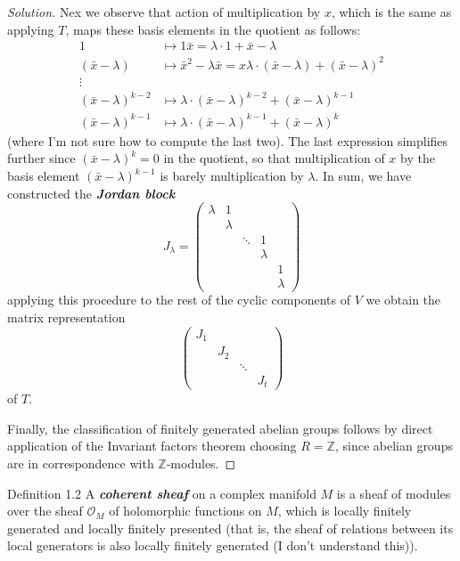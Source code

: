 \begin{proof}[Solution]
Nex we observe that action of multiplication by $x$, which is the same as applying $T$, maps these basis elements in the quotient as follows:
\begin{align*}
	1&\mapsto 1\bar{x}=\lambda\cdot 1+\bar{x}-\lambda\\
	(\bar{x}-\lambda)&\mapsto \bar{x}^2-\lambda\bar{x}=x\lambda\cdot (\bar{x}-\lambda)+(\bar{x}-\lambda)^2\\
	\vdots & \\
	(\bar{x}-\lambda)^{k-2}&\mapsto \lambda\cdot (\bar{x}-\lambda)^{k-2}+(\bar{x}-\lambda)^{k-1}\\
	(\bar{x}-\lambda)^{k-1}&\mapsto \lambda\cdot (\bar{x}-\lambda)^{k-1}+(\bar{x}-\lambda)^k
\end{align*}
(where I'm not sure how to compute the last two). The last expression simplifies further since $(\bar{x}-\lambda)^k=0$ in the quotient, so that multiplication of $x$ by the basis element $( \bar{x}-\lambda)^{k-1}$ is barely multiplication by $\lambda$. In sum, we have constructed the  \textit{\textbf{Jordan block}}
\[J_{\lambda}=\begin{pmatrix} \lambda &1\\
&\lambda\\
&&\ddots&1\\
&&&\lambda\\
&&&&1\\
&&&&\lambda
\end{pmatrix} \]
applying this procedure to the rest of the cyclic components of $V$ we obtain the  matrix representation
 \[\begin{pmatrix} J_1\\
 &J_2\\
 &&\ddots\\
 &&&J_t\end{pmatrix} \]
of $T$.

Finally, the classification of finitely generated abelian groups follows by direct application of the Invariant factors theorem choosing $R=\mathbb{Z}$, since abelian groups are in correspondence with $\mathbb{Z}$-modules.
\end{proof}

\begin{idea1}{Definition 1.2}\leavevmode
	A \textit{\textbf{coherent sheaf}} on a complex manifold $M$ is a sheaf of modules over the sheaf $\mathcal{O}_M$ of holomorphic functions on $M$, which is locally finitely generated and locally finitely presented (that is, the sheaf of relations between its local generators is also locally finitely generated {\color{2}(I don't understand this)}).
\end{idea1}

